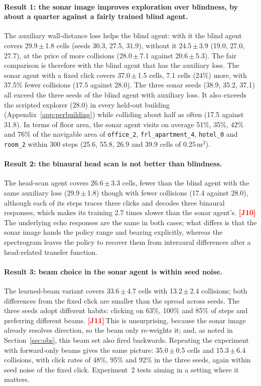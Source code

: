 \documentclass[10pt]{article}
\newif\ifreview \ifdefined\REVIEWMODE \reviewtrue \fi
\newcommand{\J}[1]{\ifreview\textcolor{red}{\textbf{[J#1]}}\,\fi}   %
\newcommand{\pmsd}[2]{#1\,{\scriptsize$\pm$\,#2}}
\begin{document}
\paragraph{Result 1: the sonar image improves exploration over blindness, by about a quarter against a fairly trained blind agent.} The auxiliary wall-distance loss helps the blind agent: with it the blind agent covers \pmsd{29.9}{1.8} cells (seeds 30.3, 27.5, 31.9), without it \pmsd{24.5}{3.9} (19.0, 27.0, 27.7), at the price of more collisions (\pmsd{28.0}{7.1} against \pmsd{20.6}{5.3}). The fair comparison is therefore with the blind agent that has the auxiliary loss. The sonar agent with a fixed click covers \pmsd{37.0}{1.5} cells, 7.1 cells (24\%) more, with 37.5\% fewer collisions (17.5 against 28.0). The three sonar seeds (38.9, 35.2, 37.1) all exceed the three seeds of the blind agent with auxiliary loss. It also exceeds the scripted explorer (28.0) in every held-out building (Appendix~\ref{app:perbuilding}) while colliding about half as often (17.5 against 31.8). In terms of floor area, the sonar agent visits on average 51\%, 35\%, 42\% and 76\% of the navigable area of \texttt{office\_2}, \texttt{frl\_apartment\_4}, \texttt{hotel\_0} and \texttt{room\_2} within 300 steps (25.6, 55.8, 26.9 and 39.9 cells of 0.25\,m$^2$).

\paragraph{Result 2: the binaural head scan is not better than blindness.} The head-scan agent covers \pmsd{26.6}{3.3} cells, fewer than the blind agent with the same auxiliary loss (\pmsd{29.9}{1.8}) though with fewer collisions (17.4 against 28.0), although each of its steps traces three clicks and decodes three binaural responses, which makes its training 2.7 times slower than the sonar agent's. \J{10}The underlying echo responses are the same in both cases; what differs is that the sonar image hands the policy range and bearing explicitly, whereas the spectrogram leaves the policy to recover them from interaural differences after a head-related transfer function.

\paragraph{Result 3: beam choice in the sonar agent is within seed noise.} The learned-beam variant covers \pmsd{33.6}{4.7} cells with \pmsd{13.2}{2.4} collisions; both differences from the fixed click are smaller than the spread across seeds. The three seeds adopt different habits: clicking on 63\%, 100\% and 85\% of steps and preferring different beams. \J{11}This is unsurprising, because the sonar image already resolves direction, so the beam only re-weights it; and, as noted in Section~\ref{sec:obs}, this beam set also fired backwards. Repeating the experiment with forward-only beams gives the same picture: \pmsd{35.0}{0.5} cells and \pmsd{15.3}{6.4} collisions, with click rates of 48\%, 95\% and 92\% in the three seeds, again within seed noise of the fixed click. Experiment~2 tests aiming in a setting where it matters.
\end{document}
